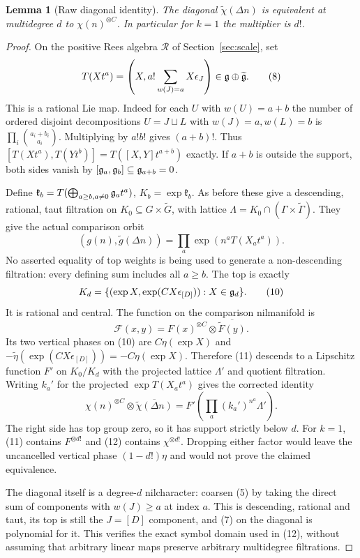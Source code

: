 \documentclass[11pt]{article}
\newtheorem{lemma}[theorem]{Lemma}
\begin{document}
\begin{lemma}[Raw diagonal identity]\label{lem:raw}
The diagonal $\widetilde\chi(\Delta n)$ is equivalent at multidegree $d$
to $\chi(n)^{\otimes C}$. In particular for $k=1$ the multiplier is $d!$.
\end{lemma}
\begin{proof}
On the positive Rees algebra $\mathcal R$ of Section~\ref{sec:scale}, set
\[
 T(Xt^a)=\left(X,a!\sum_{w(J)=a}X\epsilon_J\right)
                       \in\mathfrak g\oplus\widetilde{\mathfrak g}.           \tag{8}
\]
This is a rational Lie map. Indeed for each $U$ with $w(U)=a+b$ the
number of ordered disjoint decompositions $U=J\sqcup L$ with
$w(J)=a,w(L)=b$ is $\prod_i\binom{a_i+b_i}{a_i}$.
Multiplying by $a!b!$ gives $(a+b)!$. Thus
$[T(Xt^a),T(Yt^b)]=T([X,Y]t^{a+b})$ exactly. If $a+b$ is outside
the support, both sides vanish by $[\mathfrak g_a,\mathfrak g_b]\subseteq\mathfrak g_{a+b}=0$.

Define $\mathfrak k_b=T(\bigoplus_{a\geq b,a\ne0}\mathfrak g_a t^a)$,
$K_b=\exp\mathfrak k_b$. As before these give a descending, rational,
taut filtration on $K_0\subseteq G\times\widetilde G$, with lattice
$\Lambda=K_0\cap(\Gamma\times\widetilde\Gamma)$. They give the actual
comparison orbit
\[
 (g(n),\widetilde g(\Delta n))
       =\prod_a\exp\left(n^aT(X_at^a)\right).             \tag{9}
\]
No asserted equality of top weights is being used to generate a
non-descending filtration: every defining sum includes all $a\geq b$.
The top is exactly
\[
 K_d=\{(\exp X,\exp(CX\epsilon_{[D]})):X\in\mathfrak g_d\}.       \tag{10}
\]
It is rational and central. The function on the comparison nilmanifold is
\[
 \mathcal F(x,y)=F(x)^{\otimes C}\otimes\overline{\widetilde F(y)}.
                                                        \tag{11}
\]
Its two vertical phases on (10) are $C\eta(\exp X)$ and
$-\widetilde\eta(\exp(CX\epsilon_{[D]}))=-C\eta(\exp X)$.
Therefore (11) descends to a Lipschitz function $F'$ on
$K_0/K_d$ with the projected lattice $\Lambda'$ and quotient filtration.
Writing $k_a'$ for the projected $\exp T(X_a t^a)$ gives the corrected
identity
\[
 \chi(n)^{\otimes C}\otimes\overline{\widetilde\chi(\Delta n)}
       =F'\left(\prod_a(k_a')^{n^a}\Lambda'\right).        \tag{12}
\]
The right side has top group zero, so it has support strictly below $d$.
For $k=1$, (11) contains $F^{\otimes d!}$ and (12) contains
$\chi^{\otimes d!}$. Dropping either factor would leave the uncancelled
vertical phase $(1-d!)\eta$ and would not prove the claimed equivalence.

The diagonal itself is a degree-$d$ nilcharacter: coarsen (5) by taking
the direct sum of components with $w(J)\geq a$ at index $a$. This is
descending, rational and taut, its top is still the $J=[D]$ component,
and (7) on the diagonal is polynomial for it. This verifies the exact
symbol domain used in (12), without assuming that arbitrary linear
maps preserve arbitrary multidegree filtrations.
\end{proof}
\end{document}
